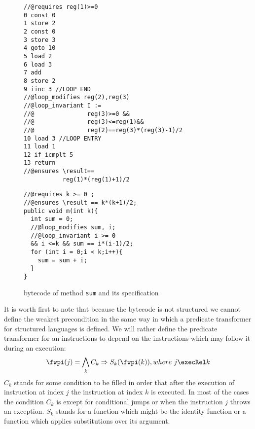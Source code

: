   
\begin{figure}[ht!]
\begin{center}
\begin{minipage}[c]{\linewidth} 
\begin{minipage}[c]{.63\linewidth}
\scriptsize{
\begin{lstlisting}[frame=trbl]
//@requires reg(1)>=0
0 const 0
1 store 2
2 const 0
3 store 3
4 goto 10
5 load 2
6 load 3
7 add
8 store 2
9 iinc 3 //LOOP END
//@loop_modifies reg(2),reg(3)
//@loop_invariant I := 
//@               reg(3)>=0 &&
//@               reg(3)<=reg(1)&&
//@               reg(2)==reg(3)*(reg(3)-1)/2
10 load 3 //LOOP ENTRY 
11 load 1
12 if_icmplt 5 
13 return
//@ensures \result==
           reg(1)*(reg(1)+1)/2
\end{lstlisting}} 
\end{minipage}


\begin{minipage}[c]{.63\linewidth} 
\scriptsize{
\begin{lstlisting}[frame=trbl]
//@requires k >= 0 ;
//@ensures \result == k*(k+1)/2;
public void m(int k){
  int sum = 0;
  //@loop_modifies sum, i;
  //@loop_invariant i >= 0 
  && i <=k && sum == i*(i-1)/2;
  for (int i = 0;i < k;i++){
    sum = sum + i;
  } 
}
\end{lstlisting} }
\end{minipage}
\end{minipage}
\end{center}
\caption{\sc  bytecode of method \lstinline!sum! and its specification }
\label{wp:example:sum}
\end{figure}


 It is worth first to note that because the bytecode is not structured we cannot define
 the weakest precondition in the same way in which a predicate transformer for structured
 languages is defined.  
 We will rather  define the predicate transformer for an instructions to depend on
 the instructions which may follow it during an execution:  
$$\fwpi( j ) = \bigwedge_k  C_k \Rightarrow S_k(\fwpi( k )) , where  \ j \execRel k $$
$C_k$ stands for some condition to be filled in order that after the execution of instruction at index $j$ the instruction at index $k$ is executed.
 In most of the cases the condition $C_k$  is \Mytrue{} except for conditional jumps or when the instruction  $j$ throws an exception.
$S_k$ stands for a function which might be the identity function or a function which applies substitutions over its argument.

